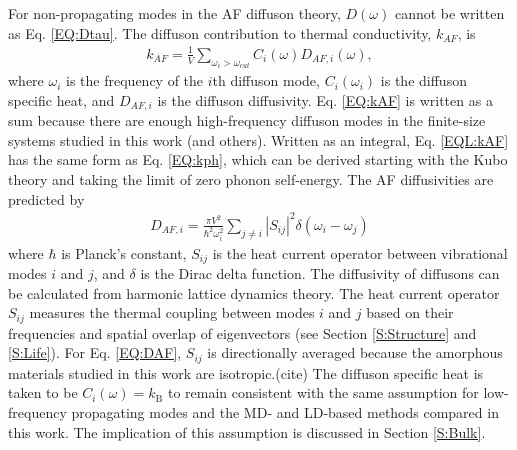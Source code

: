 \documentclass[aps,prb,onecolumn,preprint,superscriptaddress,footinbib,amsmath,amssymb,floatfix]{revtex4}
\begin{document}
For non-propagating modes in the AF diffuson theory, 
$D(\omega)$ cannot be written as Eq. \eqref{EQ:Dtau}.\cite{allen_thermal_1993}  
The diffuson contribution to thermal conductivity, $k_{AF}$, is
\cite{feldman_thermal_1993,feldman_numerical_1999}
\begin{equation}\label{EQ:kAF}
\begin{split}
k_{AF} = \frac{1}{V}\sum_{\omega_i>\omega_{cut}} C_i(\omega) D_{AF,i}(\omega), 
\end{split}
\end{equation}
where $\omega_i$ is the frequency of the $i$th diffuson mode, $C_i(\omega_i)$ 
is the diffuson specific heat, and $D_{AF,i}$ is the diffuson diffusivity.
Eq. \eqref{EQ:kAF} is written as a sum because there are enough high-frequency 
diffuson modes in the finite-size systems studied in this work (and others).
\cite{feldman_thermal_1993,feldman_numerical_1999} 
Written as an integral, Eq. \eqref{EQL:kAF} has the same form as 
Eq. \ref{EQ:kph}, which can be derived starting 
with the Kubo theory
\cite{flicker_lattice_1973,allen_thermal_1993,alam_lattice_2005,
baldi_thermal_2008,yang_anomalously_2010}  
and taking the limit 
of zero phonon self-energy.\cite{baldi_thermal_2008} 
The AF diffusivities are predicted by\cite{allen_thermal_1993} 
\begin{equation}\label{EQ:DAF}
\begin{split}
D_{AF,i} = \frac{\pi V^2}{\hbar^2\omega^2_i}\sum_{j\neq i}
|S_{ij}|^2 \delta(\omega_i - \omega_j)
\end{split}
\end{equation}
where $\hbar$ is Planck's constant, $S_{ij}$ is the heat current operator 
between vibrational modes $i$ and $j$, and $\delta$ is the Dirac delta 
function. The diffusivity of diffusons 
can be calculated from harmonic lattice dynamics theory.
\cite{allen_thermal_1993,feldman_thermal_1993,feldman_numerical_1999} 
The heat current operator $S_{ij}$ measures the thermal 
coupling between modes $i$ and $j$ based on their frequencies and 
spatial overlap of eigenvectors 
(see Section \ref{S:Structure} and \ref{S:Life}). 
For Eq. \eqref{EQ:DAF}, $S_{ij}$ is directionally averaged because 
the amorphous materials studied in this work are isotropic.(cite) 
The diffuson specific heat is taken to be $C_i(\omega) = k_{\text{B}}$ 
to remain consistent with the same assumption for low-frequency propagating 
modes and the MD- and LD-based methods compared in this work. 
The implication of this assumption is discussed in Section \ref{S:Bulk}.
\end{document}
